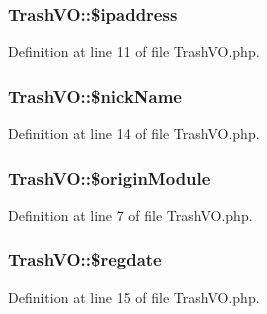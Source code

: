 \hypertarget{classTrashVO_add9ea842dcdbcd81a3fef932cd622e18}{}
\subsubsection[{\$ipaddress}]{\setlength{\rightskip}{0pt plus 5cm}Trash\+V\+O\+::\$ipaddress}\label{classTrashVO_add9ea842dcdbcd81a3fef932cd622e18}


Definition at line 11 of file Trash\+V\+O.\+php.

\hypertarget{classTrashVO_a8084a8637a7a98cc7f1182bd7b86e5de}{}
\subsubsection[{\$nick\+Name}]{\setlength{\rightskip}{0pt plus 5cm}Trash\+V\+O\+::\$nick\+Name}\label{classTrashVO_a8084a8637a7a98cc7f1182bd7b86e5de}


Definition at line 14 of file Trash\+V\+O.\+php.

\hypertarget{classTrashVO_ad977787e04708af64f4c9d4891d3f682}{}
\subsubsection[{\$origin\+Module}]{\setlength{\rightskip}{0pt plus 5cm}Trash\+V\+O\+::\$origin\+Module}\label{classTrashVO_ad977787e04708af64f4c9d4891d3f682}


Definition at line 7 of file Trash\+V\+O.\+php.

\hypertarget{classTrashVO_a54388f0f415f3e5c302eec871e790434}{}
\subsubsection[{\$regdate}]{\setlength{\rightskip}{0pt plus 5cm}Trash\+V\+O\+::\$regdate}\label{classTrashVO_a54388f0f415f3e5c302eec871e790434}


Definition at line 15 of file Trash\+V\+O.\+php.

\hypertarget{classTrashVO_aa51410763a3b44a76853d8a347793903}{}
